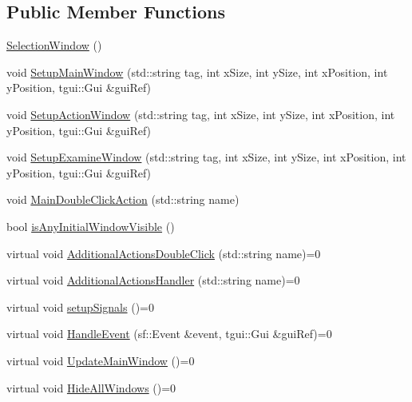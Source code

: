 \subsection*{Public Member Functions}
\begin{DoxyCompactItemize}
\item 
\mbox{\hyperlink{class_selection_window_a4679147ef0f718a3cb73997695b4dca9}{Selection\+Window}} ()
\item 
void \mbox{\hyperlink{class_selection_window_a114554837c81ec32275741764bfccdc0}{Setup\+Main\+Window}} (std\+::string tag, int x\+Size, int y\+Size, int x\+Position, int y\+Position, tgui\+::\+Gui \&gui\+Ref)
\item 
void \mbox{\hyperlink{class_selection_window_a091bd686d352a2cf1236aa56a2e70174}{Setup\+Action\+Window}} (std\+::string tag, int x\+Size, int y\+Size, int x\+Position, int y\+Position, tgui\+::\+Gui \&gui\+Ref)
\item 
void \mbox{\hyperlink{class_selection_window_a364adfebc05e660c153d58117762ed97}{Setup\+Examine\+Window}} (std\+::string tag, int x\+Size, int y\+Size, int x\+Position, int y\+Position, tgui\+::\+Gui \&gui\+Ref)
\item 
void \mbox{\hyperlink{class_selection_window_aad256b3ad7d9dfef1465a3ca9bba6e5b}{Main\+Double\+Click\+Action}} (std\+::string name)
\item 
bool \mbox{\hyperlink{class_selection_window_a40ffbdbd4b8bc3ef84208faed2ae97da}{is\+Any\+Initial\+Window\+Visible}} ()
\item 
virtual void \mbox{\hyperlink{class_selection_window_a853f6c1c78163cd976d8a7d7bf1a9153}{Additional\+Actions\+Double\+Click}} (std\+::string name)=0
\item 
virtual void \mbox{\hyperlink{class_selection_window_aaa0131b5b67dc5b3f7ebb85835cd31a7}{Additional\+Actions\+Handler}} (std\+::string name)=0
\item 
virtual void \mbox{\hyperlink{class_selection_window_a912063c60bb6c7899422b5d470bcf64e}{setup\+Signals}} ()=0
\item 
virtual void \mbox{\hyperlink{class_selection_window_a2a7aa65a4c77fce6f2a44a0d10b911eb}{Handle\+Event}} (sf\+::\+Event \&event, tgui\+::\+Gui \&gui\+Ref)=0
\item 
virtual void \mbox{\hyperlink{class_selection_window_a4ccb50fc06840c6c3966c89b1d991b03}{Update\+Main\+Window}} ()=0
\item 
virtual void \mbox{\hyperlink{class_selection_window_a1d0561e5fbd751025c71484589f83841}{Hide\+All\+Windows}} ()=0
\item 

\end{DoxyCompactItemize}
